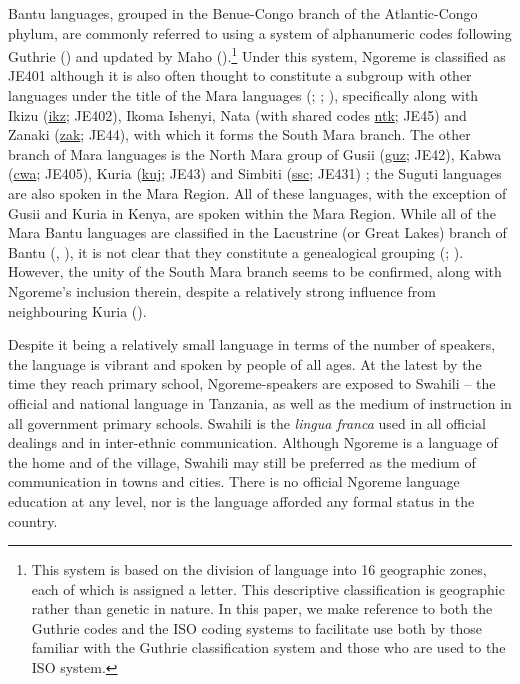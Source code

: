 \documentclass[output=paper,colorlinks,citecolor=brown,draftmode]{langscibook}
\begin{document}
Bantu languages, grouped in the Benue-Congo branch of the Atlantic-Congo phylum, are commonly referred to using a system of alphanumeric codes following Guthrie (\citeyear{Guthrie1948, Guthrie1967--71}) and updated by Maho (\citeyear{Maho2003,Maho2009}).\footnote{This system is based on the division of language into 16 geographic zones, each of which is assigned a letter. This descriptive classification is geographic rather than genetic in nature. In this paper, we make reference to both the Guthrie codes and the ISO coding systems to facilitate use both by those familiar with the Guthrie classification system and those who are used to the ISO system.} Under this system, Ngoreme is classified as JE401 although it is also often thought to constitute a subgroup with other languages under the title of the Mara languages (\citealt[9]{Nurse1999}; \citealt[519]{NurseMuzale1999}; \citealt[170]{NursePhilippson2003}), specifically along with Ikizu (\href{https://iso639-3.sil.org/code/ngq}{ikz}; JE402), Ikoma Ishenyi, Nata (with shared codes \href{https://iso639-3.sil.org/code/ngq}{ntk}; JE45) and Zanaki (\href{https://iso639-3.sil.org/code/ngq}{zak}; JE44), with which it forms the South Mara branch. 
The other branch of Mara languages is the North Mara group of Gusii (\href{https://iso639-3.sil.org/code/ngq}{guz}; JE42), Kabwa (\href{https://iso639-3.sil.org/code/ngq}{cwa}; JE405), Kuria (\href{https://iso639-3.sil.org/code/ngq}{kuj}; JE43) and Simbiti (\href{https://iso639-3.sil.org/code/ngq}{ssc}; JE431) \citep{AunioEtAl2019}; the Suguti languages are also spoken in the Mara Region. All of these languages, with the exception of Gusii and Kuria in Kenya, are spoken within the Mara Region. While all of the Mara Bantu languages are classified in the Lacustrine (or Great Lakes) branch of Bantu (\citealt{Schoenbrun1994}, \citeyear{Schoenbrun1997}), it is not clear that they constitute a genealogical grouping (\citealt{Walker2013}; \citealt{Roth2018}). However, the unity of the South Mara branch seems to be confirmed, along with Ngoreme’s inclusion therein, despite a relatively strong influence from neighbouring Kuria (\citealt{RothGibson2019}).

Despite it being a relatively small language in terms of the number of speakers, the language is vibrant and spoken by people of all ages. At the latest by the time they reach primary school, Ngoreme-speakers are exposed to Swahili – the official and national language in Tanzania, as well as the medium of instruction in all government primary schools. Swahili is the \textit{lingua franca} used in all official dealings and in inter-ethnic communication. Although Ngoreme is a language of the home and of the village, Swahili may still be preferred as the medium of communication in towns and cities. There is no official Ngoreme language education at any level, nor is the language afforded any formal status in the country.
\end{document}
